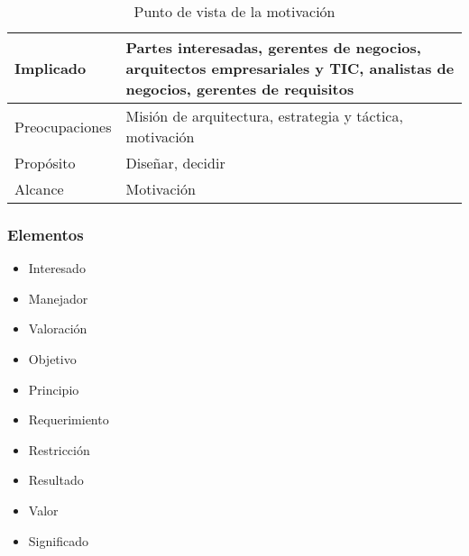 \begin{table}[ht]
	\begin{center}
		
		\begin{tabular}{ | m{6em} | m{8cm}|  } 
			\hline
			Implicado & Partes interesadas, gerentes de negocios, arquitectos empresariales y TIC, analistas de negocios, gerentes de requisitos 
			\\
			\hline
			Preocupaciones & Misión de arquitectura, estrategia y táctica, motivación
			\\
			\hline
			Propósito & Diseñar, decidir
			\\
			\hline
			Alcance & Motivación
			\\
			\hline
		\end{tabular}
		\caption{Punto de vista de la motivación}
		\label{tab:concepts}
	\end{center}
\end{table}

\subsubsection{Elementos}
\begin{itemize}
	\item Interesado
	\item Manejador
	\item Valoración
	\item Objetivo
	\item Principio
	\item Requerimiento
	\item Restricción
	\item Resultado
	\item Valor
	\item Significado
\end{itemize}